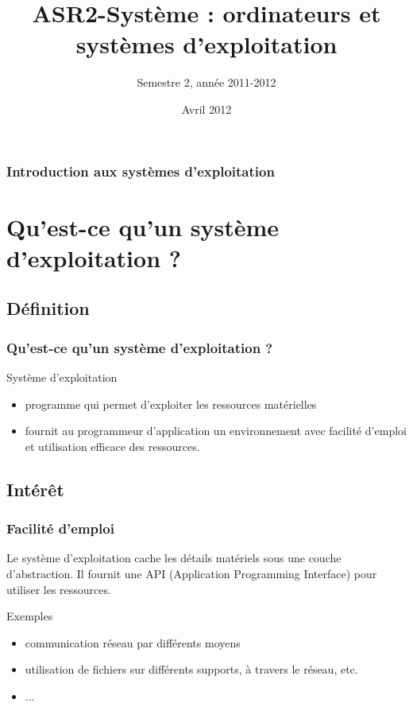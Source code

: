 \documentclass{beamer}
\title{ASR2-Système : ordinateurs et systèmes d'exploitation}
\author{Semestre 2, année 2011-2012}
\institute{
  Département d'Informatique\\
  IUT Bordeaux 1
}
\date{Avril 2012}
\begin{document}
  

\begin{frame}
  \titlepage
\end{frame}

\begin{frame}
  \frametitle{Introduction aux systèmes d'exploitation}
  \tableofcontents
\end{frame}

  

\section{Qu'est-ce qu'un système d'exploitation ?}
\subsection{Définition}

\begin{frame}
  \frametitle{Qu'est-ce qu'un système d'exploitation ?}
  
  \begin{block}{Système d'exploitation}
    \begin{itemize}
    \item programme qui permet d'exploiter les ressources matérielles
    \item fournit \alert{au programmeur d'application} un
      environnement avec facilité d'emploi et utilisation efficace des
      ressources.
    \end{itemize}
  \end{block}
\end{frame}

\subsection{Intérêt}

\begin{frame}
  \frametitle{Facilité d'emploi} 
  
  Le système d'exploitation cache les détails matériels
  sous une \alert{couche
    d'abstraction.}
\vfill  
Il fournit une API (Application Programming Interface) pour utiliser les
ressources.
\vfill
  \begin{block}{Exemples}
    \begin{itemize}
    \item communication réseau par différents moyens
    \item utilisation de fichiers sur différents supports, à travers le réseau, etc.
    \item ...
    \end{itemize}
  \end{block}
\end{frame}
  
\end{document}

